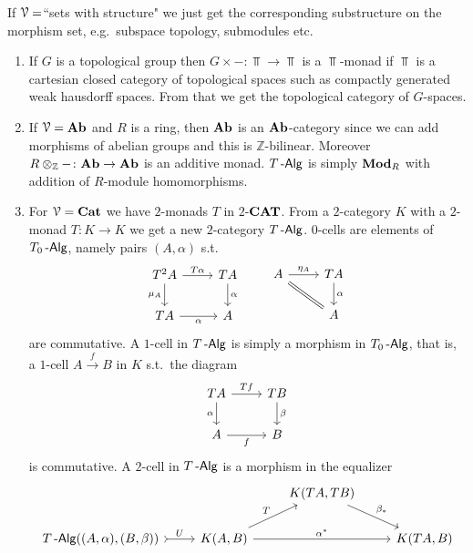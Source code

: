 \documentclass[a4paper,11pt,oneside,openany]{scrbook}
\begin{document}
\begin{exmp}
	If $\operatorname{\mathcal{V}}=$``sets with structure" we just get the corresponding substructure on the morphism set, e.g.\ subspace topology, submodules etc.
	\begin{enumerate}
		\item If $G$ is a topological group then $G\times-\colon\Top\to\Top$ is a $\Top$-monad if $\Top$ is a cartesian closed category of topological spaces such as compactly generated weak hausdorff spaces. From that we get the topological category of $G$-spaces.
		\item If $\operatorname{\mathcal{V}}={\normalfont\textbf{Ab}}$ and $R$ is a ring, then ${\normalfont\textbf{Ab}}$ is an ${\normalfont\textbf{Ab}}$-category since we can add morphisms of abelian groups and this is $\mathbb{Z}$-bilinear. Moreover $R\otimes_\mathbb{Z}-\colon{\normalfont\textbf{Ab}}\to{\normalfont\textbf{Ab}}$ is an additive monad. $T\operatorname{-\mathsf{Alg}}$ is simply ${\normalfont\textbf{Mod}}_R$ with addition of $R$-module homomorphisms.
		\item For $\operatorname{\mathcal{V}}={\normalfont\textbf{Cat}}$ we have $2$-monads $T$ in $2$-${\normalfont\textbf{CAT}}$. From a $2$-category $K$ with a $2$-monad $T\colon K\to K$ we get a new $2$-category $T\operatorname{-\mathsf{Alg}}$.
		      $0$-cells are elements of $T_0\operatorname{-\mathsf{Alg}}$, namely pairs $(A,\alpha)$ s.t.
		      \[
			      \begin{tikzcd}
				      T^2 A\ar["\mu_{A}"']{d}\ar["T\alpha"]{r}
				      & TA\ar["\alpha"]{d} \\
				      TA\ar["\alpha"']{r}
				      & A
			      \end{tikzcd}
			      \quad\quad
			      \begin{tikzcd}
				      A\ar[equal, swap]{dr}\ar["\eta_{A}"]{r}
				      & TA\ar["\alpha"]{d} \\
				      & A
			      \end{tikzcd}
		      \]
		      are commutative.
		      A $1$-cell in $T\operatorname{-\mathsf{Alg}}$ is simply a morphism in $T_0\operatorname{-\mathsf{Alg}}$, that is, a $1$-cell $A\xrightarrow{f}B$ in $K$ s.t.\ the diagram
		      \[
			      \begin{tikzcd}
				      TA\arrow[d, "\alpha"']\arrow["Tf"]{r}
				      & TB\arrow[d, "\beta"]\\
				      A\arrow["f"']{r}
				      & B
			      \end{tikzcd}
		      \]
		      is commutative. A $2$-cell in $T\operatorname{-\mathsf{Alg}}$ is a morphism in the equalizer
		      \[
			      \begin{tikzcd}
				      && K(TA,TB) \arrow[rd, "\beta_*"] &  \\
				      T\Alg((A,\alpha),(B,\beta)) \arrow[r, tail, "U"] & K(A,B) \arrow[rr, "\alpha^*"] \arrow[ru, "T"] &             & K(TA,B)
			      \end{tikzcd}
\]
\end{enumerate}
\end{exmp}
\end{document}
